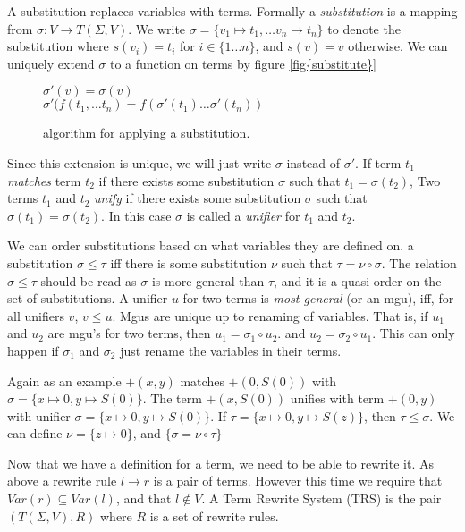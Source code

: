 \documentclass{article}
\theoremstyle{definition}
\begin{document}
A substitution replaces variables with terms.
Formally a \textit{substitution} is a mapping from $\sigma : V \to T(\Sigma,V)$.
We write $\sigma = \{v_1 \mapsto t_1, \ldots v_n \mapsto t_n\}$ to denote the substitution
where $s(v_i) = t_i$ for $i \in \{1\ldots n\}$, and $s(v) = v$ otherwise.
We can uniquely extend $\sigma$ to a function on terms by figure \ref{fig{substitute}}

\begin{figure}[h]
    $\sigma'(v) = \sigma(v)$\\
    $\sigma'(f(t_1,\ldots t_n) = f(\sigma'(t_1) \ldots \sigma'(t_n))$\\
    \label{fig:substitute}
    \caption{algorithm for applying a substitution.}
\end{figure}

Since this extension is unique, we will just write $\sigma$ instead of $\sigma'$.
If term $t_1$ \textit{matches} term $t_2$ if there exists some substitution $\sigma$ such that $t_1 = \sigma(t_2)$,
Two terms $t_1$ and $t_2$ \textit{unify} if there exists some substitution $\sigma$ such that $\sigma(t_1) = \sigma(t_2)$.
In this case $\sigma$ is called a \textit{unifier} for $t_1$ and $t_2$.

We can order substitutions based on what variables they are defined on.
a substitution $\sigma \leq \tau$ iff there is some substitution $\nu$ such that $\tau = \nu \circ \sigma$.
The relation $\sigma \leq \tau$ should be read as $\sigma$ is more general than $\tau$,
and it is a quasi order on the set of substitutions.
A unifier $u$ for two terms is \textit{most general} (or an mgu), iff, for all unifiers $v$, $v \le u$.
Mgus are unique up to renaming of variables.
That is, if $u_1$ and $u_2$ are mgu's for two terms, then $u_1 = \sigma_1 \circ u_2$.
and $u_2 = \sigma_2 \circ u_1$.  This can only happen if $\sigma_1$ and $\sigma_2$ just rename the variables in their terms.

Again as an example $+(x,y)$ matches $+(0, S(0))$ with $\sigma = \{x \mapsto 0, y \mapsto S(0)\}$.
The term $+(x, S(0))$ unifies with term $+(0, y)$ with unifier
$\sigma = \{x \mapsto 0, y \mapsto S(0)\}$.
If $\tau = \{x \mapsto 0, y \mapsto S(z)\}$, then $\tau \le \sigma$.  We can define $\nu = \{z \mapsto 0\}$,
and $\{\sigma = \nu \circ \tau\}$

Now that we have a definition for a term, we need to be able to rewrite it.
As above a rewrite rule $l \to r$ is a pair of terms.
However this time we require that $Var(r) \subseteq Var(l)$, and that $l \not \in V$.
A Term Rewrite System (TRS) is the pair $(T(\Sigma,V),R)$ where $R$ is a set of rewrite rules.
\end{document}
